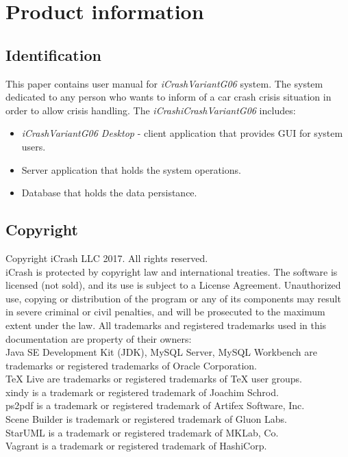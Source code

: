 \chapter{Product information}
\vspace{-6em}


\section{Identification}
This paper contains user manual for \emph{iCrashVariantG06} system. The system
dedicated to any person who wants to inform of a car crash crisis situation in
order to allow crisis handling. The \emph{iCrashiCrashVariantG06} includes:
\begin{itemize}
  \item  \emph{iCrashVariantG06 Desktop} - client application that
  provides GUI for system users.
  \item Server application that holds the system operations.
  \item Database that holds the data persistance.
\end{itemize}

\section{Copyright}

Copyright iCrash LLC 2017. All rights reserved.\\
iCrash is protected by copyright law and international treaties. The software is
licensed (not sold), and its use is subject to a License Agreement. Unauthorized
use, copying or distribution of the program or any of its components may result in severe criminal or civil penalties, and will be prosecuted to the maximum extent under the law.
All trademarks and registered trademarks used in this documentation are property
of their owners:\\
Java SE Development Kit (JDK), MySQL Server, MySQL Workbench are trademarks or
registered trademarks of Oracle Corporation.\\
TeX Live are trademarks or registered trademarks of TeX user groups.\\
xindy is a trademark or registered trademark of Joachim Schrod. \\
ps2pdf  is a trademark or registered trademark of Artifex Software, Inc.\\
Scene Builder is trademark or registered trademark of Gluon Labs.\\
StarUML is a trademark or registered trademark of MKLab, Co.\\
Vagrant is a trademark or registered trademark of HashiCorp.\\


